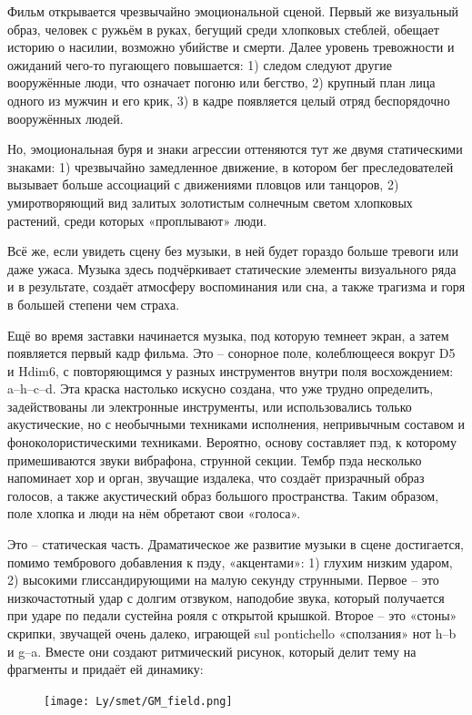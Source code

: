 Фильм открывается чрезвычайно эмоциональной сценой.
Первый же визуальный образ, человек с ружьём в руках, бегущий среди хлопковых стеблей, обещает историю о насилии, возможно убийстве и смерти.
Далее уровень тревожности и ожиданий чего-то пугающего повышается: 1) следом следуют другие вооружённые люди, что означает погоню или бегство, 2) крупный план лица одного из мужчин и его крик, 3) в кадре появляется целый отряд беспорядочно вооружённых людей.

Но, эмоциональная буря и знаки агрессии оттеняются тут же двумя статическими знаками: 1) чрезвычайно замедленное движение, в котором бег преследователей вызывает больше ассоциаций с движениями пловцов или танцоров, 2) умиротворяющий вид залитых золотистым солнечным светом хлопковых растений, среди которых «проплывают» люди.

Всё же, если увидеть сцену без музыки, в ней будет гораздо больше тревоги или даже ужаса.
Музыка здесь подчёркивает статические элементы визуального ряда и в результате, создаёт атмосферу воспоминания или сна, а также трагизма и горя в большей степени чем страха.

Ещё во время заставки начинается музыка, под которую темнеет экран, а затем появляется первый кадр фильма.
Это -- сонорное поле, колеблющееся вокруг D5 и Hdim6, с повторяющимся у разных инструментов внутри поля восхождением: a--h--c--d.
Эта краска настолько искусно создана, что уже трудно определить, задействованы ли электронные инструменты, или использовались только акустические, но с необычными техниками исполнения, непривычным составом и фоноколористическими техниками.
Вероятно, основу составляет пэд, к которому примешиваются звуки вибрафона, струнной секции.
Тембр пэда несколько напоминает хор и орган, звучащие издалека, что создаёт призрачный образ голосов, а также акустический образ большого пространства.
Таким образом, поле хлопка и люди на нём обретают свои «голоса».

Это -- статическая часть.
Драматическое же развитие музыки в сцене достигается, помимо тембрового добавления к пэду, «акцентами»: 1) глухим низким ударом, 2) высокими глиссандирующими на малую секунду струнными.
Первое -- это низкочастотный удар с долгим отзвуком, наподобие звука, который получается при ударе по педали сустейна рояля с открытой крышкой.
Второе -- это «стоны» скрипки, звучащей очень далеко, играющей sul pontichello «сползания» нот h--b и g--a.
Вместе они создают ритмический рисунок, который делит тему на фрагменты и придаёт ей динамику:

\begin{figure}
\centering
\texttt{[image: Ly/smet/GM\_field.png]}
\caption{}
\end{figure}

